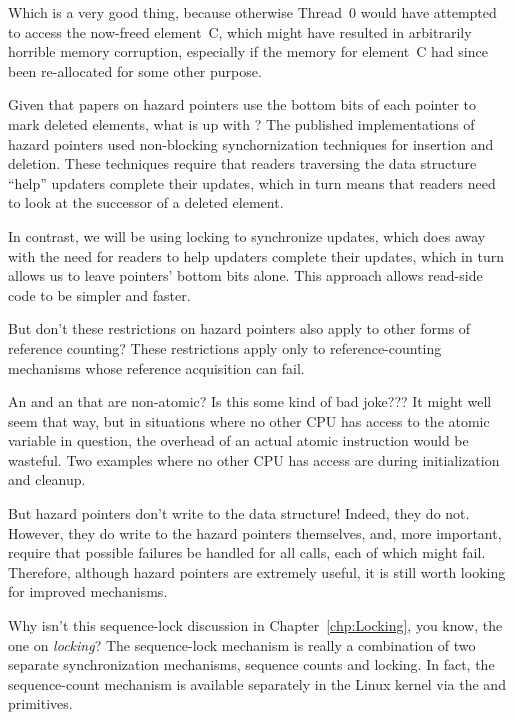 \begin{enumerate}
	Which is a very good thing, because otherwise Thread~0 would
	have attempted to access the now-freed element~C,
	which might have resulted in arbitrarily horrible
	memory corruption, especially if the memory for
	element~C had since been re-allocated for some other
	purpose.

\QuickQ{}
	Given that papers on hazard pointers use the bottom bits
	of each pointer to mark deleted elements, what is up with
	?
\QuickA{}
	The published implementations of hazard pointers used
	non-blocking synchornization techniques for insertion
	and deletion.
	These techniques require that readers traversing the
	data structure ``help'' updaters complete their updates,
	which in turn means that readers need to look at the successor
	of a deleted element.

	In contrast, we will be using locking to synchronize updates,
	which does away with the need for readers to help updaters
	complete their updates, which in turn allows us to leave
	pointers' bottom bits alone.
	This approach allows read-side code to be simpler and faster.

\QuickQ{}
	But don't these restrictions on hazard pointers also apply
	to other forms of reference counting?
\QuickA{}
	These restrictions apply only to reference-counting mechanisms whose
	reference acquisition can fail.

\QuickQ{}
	An  and an  that are
	non-atomic?
	Is this some kind of bad joke???
\QuickA{}
	It might well seem that way, but in situations where no other
	CPU has access to the atomic variable in question, the overhead
	of an actual atomic instruction would be wasteful.
	Two examples where no other CPU has access are
	during initialization and cleanup.

\QuickQ{}
	But hazard pointers don't write to the data structure!
\QuickA{}
	Indeed, they do not.
	However, they do write to the hazard pointers themselves,
	and, more important, require that possible failures be
	handled for all  calls, each of which
	might fail.
	Therefore, although hazard pointers are extremely useful,
	it is still worth looking for improved mechanisms.

\QuickQ{}
	Why isn't this sequence-lock discussion in Chapter~\ref{chp:Locking},
	you know, the one on \emph{locking}?
\QuickA{}
	The sequence-lock mechanism is really a combination of two
	separate synchronization mechanisms, sequence counts and
	locking.
	In fact, the sequence-count mechanism is available separately
	in the Linux kernel via the
	 and 
	primitives.


\end{enumerate}
